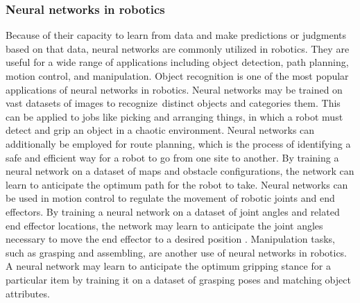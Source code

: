 \documentclass[12pt,oneside]{article}
\begin{document}
\subsubsection{Neural networks in robotics}
Because of their capacity to learn from data and make predictions or judgments based on that data, neural networks are commonly utilized in robotics. They are useful for a wide range of applications including object detection, path planning, motion control, and manipulation. 
Object recognition is one of the most popular applications of neural networks in robotics. Neural networks may be trained on vast datasets of images to recognize distinct objects and categories them. This can be applied to jobs like picking and arranging things, in which a robot must detect and grip an object in a chaotic environment.
Neural networks can additionally be employed for route planning, which is the process of identifying a safe and efficient way for a robot to go from one site to another. By training a neural network on a dataset of maps and obstacle configurations, the network can learn to anticipate the optimum path for the robot to take.
Neural networks can be used in motion control to regulate the movement of robotic joints and end effectors. By training a neural network on a dataset of joint angles and related end effector locations, the network may learn to anticipate the joint angles necessary to move the end effector to a desired position \cite{44_villegas2018neural}.
Manipulation tasks, such as grasping and assembling, are another use of neural networks in robotics. A neural network may learn to anticipate the optimum gripping stance for a particular item by training it on a dataset of grasping poses and matching object attributes.
\end{document}
